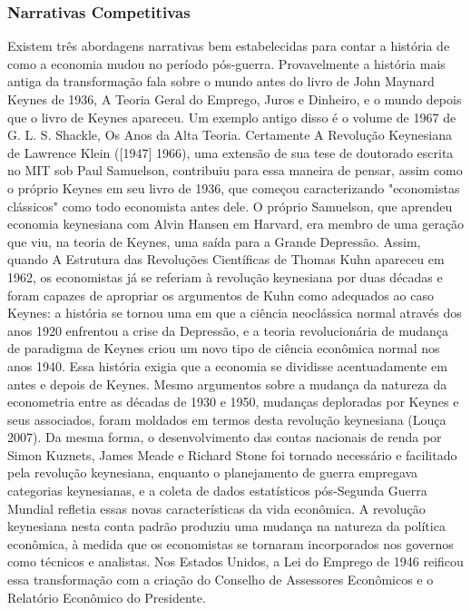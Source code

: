 \documentclass[12pt]{article}
\begin{document}
\subsubsection{\textbf{Narrativas Competitivas}}

Existem três abordagens narrativas bem estabelecidas para contar a história de como a economia mudou no período pós-guerra. Provavelmente a história mais antiga da transformação fala sobre o mundo antes do livro de John Maynard Keynes de 1936, A Teoria Geral do Emprego, Juros e Dinheiro, e o mundo depois que o livro de Keynes apareceu. Um exemplo antigo disso é o volume de 1967 de G. L. S. Shackle, Os Anos da Alta Teoria. Certamente A Revolução Keynesiana de Lawrence Klein ([1947] 1966), uma extensão de sua tese de doutorado escrita no MIT sob Paul Samuelson, contribuiu para essa maneira de pensar, assim como o próprio Keynes em seu livro de 1936, que começou caracterizando "economistas clássicos" como todo economista antes dele. O próprio Samuelson, que aprendeu economia keynesiana com Alvin Hansen em Harvard, era membro de uma geração que viu, na teoria de Keynes, uma saída para a Grande Depressão. Assim, quando A Estrutura das Revoluções Científicas de Thomas Kuhn apareceu em 1962, os economistas já se referiam à revolução keynesiana por duas décadas e foram capazes de apropriar os argumentos de Kuhn como adequados ao caso Keynes: a história se tornou uma em que a ciência neoclássica normal através dos anos 1920 enfrentou a crise da Depressão, e a teoria revolucionária de mudança de paradigma de Keynes criou um novo tipo de ciência econômica normal nos anos 1940. Essa história exigia que a economia se dividisse acentuadamente em antes e depois de Keynes. Mesmo argumentos sobre a mudança da natureza da econometria entre as décadas de 1930 e 1950, mudanças deploradas por Keynes e seus associados, foram moldados em termos desta revolução keynesiana (Louça 2007). Da mesma forma, o desenvolvimento das contas nacionais de renda por Simon Kuznets, James Meade e Richard Stone foi tornado necessário e facilitado pela revolução keynesiana, enquanto o planejamento de guerra empregava categorias keynesianas, e a coleta de dados estatísticos pós-Segunda Guerra Mundial refletia essas novas características da vida econômica. A revolução keynesiana nesta conta padrão produziu uma mudança na natureza da política econômica, à medida que os economistas se tornaram incorporados nos governos como técnicos e analistas. Nos Estados Unidos, a Lei do Emprego de 1946 reificou essa transformação com a criação do Conselho de Assessores Econômicos e o Relatório Econômico do Presidente.
\end{document}
